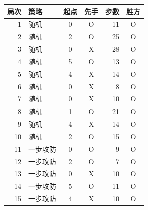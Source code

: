 \begin{tabular}{rlccrc}
\toprule
局次 & 策略 & 起点 & 先手 & 步数 & 胜方 \\
\midrule
1 & 随机 & 0 & O & 11 & O \\
2 & 随机 & 2 & O & 25 & O \\
3 & 随机 & 0 & X & 28 & O \\
4 & 随机 & 5 & O & 13 & O \\
5 & 随机 & 4 & X & 14 & O \\
6 & 随机 & 0 & X & 8 & O \\
7 & 随机 & 0 & X & 10 & O \\
8 & 随机 & 1 & O & 21 & O \\
9 & 随机 & 4 & X & 14 & O \\
10 & 随机 & 2 & O & 15 & O \\
11 & 一步攻防 & 0 & O & 9 & O \\
12 & 一步攻防 & 2 & O & 7 & O \\
13 & 一步攻防 & 0 & X & 10 & O \\
14 & 一步攻防 & 5 & O & 11 & O \\
15 & 一步攻防 & 4 & X & 10 & O \\
\bottomrule
\end{tabular}
